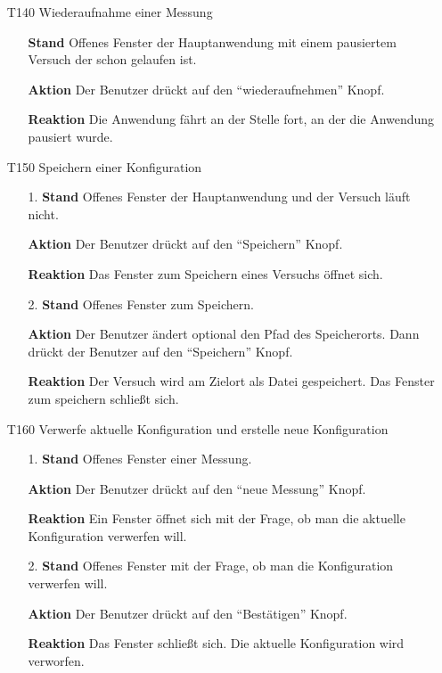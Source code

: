 \documentclass[parskip=full]{scrartcl}
\begin{document}
\begin{itemize}
\begin{itemize}
\end{itemize}

\item[T140] Wiederaufnahme einer Messung
\begin{itemize}

\item[]\textbf {Stand} Offenes Fenster der Hauptanwendung mit einem pausiertem Versuch der schon gelaufen ist.
\item[]\textbf{Aktion} Der Benutzer drückt auf den "`wiederaufnehmen"' Knopf.
\item[]\textbf{Reaktion} Die Anwendung fährt an der Stelle fort, an der die Anwendung pausiert wurde.

\end{itemize}

\item[T150] Speichern einer Konfiguration
\begin{itemize}

\item[1.]\textbf {Stand} Offenes Fenster der Hauptanwendung und der Versuch läuft nicht.
\item[]\textbf{Aktion} Der Benutzer drückt auf den "`Speichern"' Knopf.
\item[]\textbf{Reaktion} Das Fenster zum Speichern eines Versuchs öffnet sich.

\item[2.]\textbf {Stand} Offenes Fenster zum Speichern.
\item[]\textbf{Aktion} Der Benutzer ändert optional den Pfad des Speicherorts. Dann drückt der Benutzer auf den "`Speichern"' Knopf.
\item[]\textbf{Reaktion} Der Versuch wird am Zielort als Datei gespeichert. Das Fenster zum speichern schließt sich.

\end{itemize}

\item[T160] Verwerfe aktuelle Konfiguration und erstelle neue Konfiguration
\begin{itemize}

\item[1.]\textbf {Stand} Offenes Fenster einer Messung.
\item[]\textbf{Aktion} Der Benutzer drückt auf den "`neue Messung"' Knopf.
\item[]\textbf{Reaktion} Ein Fenster öffnet sich mit der Frage, ob man die aktuelle Konfiguration verwerfen will.

\item[2.]\textbf {Stand} Offenes Fenster mit der Frage, ob man die Konfiguration verwerfen will.
\item[]\textbf{Aktion} Der Benutzer drückt auf den "`Bestätigen"' Knopf.
\item[]\textbf{Reaktion} Das Fenster schließt sich. Die aktuelle Konfiguration wird verworfen.


\end{itemize}
\end{itemize}
\end{document}

